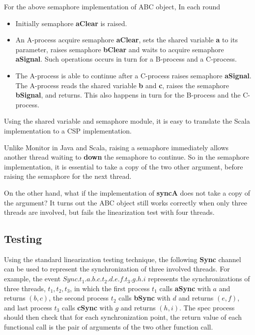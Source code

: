\documentclass{article}
\begin{document}
For the above semaphore implementation of ABC object, In each round
\begin{itemize}
    \item Initially semaphore \textbf{aClear} is raised.
    \item An A-process acquire semaphore \textbf{aClear}, sets the shared variable \textbf{a} to its parameter, raises semaphore \textbf{bClear} and waits to acquire semaphore \textbf{aSignal}. Such operations occurs in turn for a B-process and a C-process.
    \item The A-process is able to continue after a C-process raises semaphore \textbf{aSignal}. The A-process reads the shared variable \textbf{b} and \textbf{c}, raises the semaphore \textbf{bSignal}, and returns. This also happens in turn for the B-process and the C-process.
\end{itemize}

Using the shared variable and semaphore module, it is easy to translate the Scala implementation to a CSP implementation. 

Unlike Monitor in Java and Scala, raising a semaphore immediately allows another thread waiting to \textbf{down} the semaphore to continue. So in the semaphore implementation, it is essential to take a copy of the two other argument, before raising the semaphore for the next thread. 

On the other hand, what if the implementation of \textbf{syncA} does not take a copy of the argument? It turns out the ABC object still works correctly when only three threads are involved, but fails the linearization test with four threads.

\subsection{Testing}
Using the standard linearization testing technique, the following \textbf{Sync} channel can be used to represent the synchronization of three involved threads. For example, the event $Sync.t_1.a.b.c.t_2.d.e.f.t_3.g.h.i$ represents the synchronizations of three threads, $t_1,t_2,t_3$, in which the first process $t_1$ calls \textbf{aSync} with $a$ and returns $(b,c)$, the second process $t_2$ calls \textbf{bSync} with $d$ and returns $(e,f)$, and last process $t_3$ calls \textbf{cSync} with $g$ and returns $(h,i)$. The spec process should then check that for each synchronization point, the return value of each functional call is the pair of arguments of the two other function call.
\end{document}
